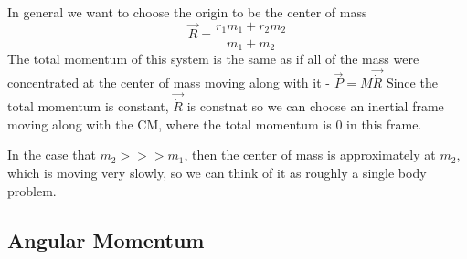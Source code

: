\documentclass{homework}
\begin{document}
In general we want to choose the origin to be the center of mass
\[\vec{R} = \frac{r_1m_1 + r_2m_2}{m_1 + m_2}\]
The total momentum of this system is the same as if all of the mass were concentrated at the center of mass moving along with it - $\vec{P} = M\vec{\dot R}$ Since the total momentum is constant, $\vec{\dot R}$ is constnat so we can choose an inertial frame moving along with the CM, where the total momentum is $0$ in this frame.

In the case that $m_2 >>> m_1$, then the center of mass is approximately at $m_2$, which is moving very slowly, so we can think of it as roughly a single body problem.

\subsection{Angular Momentum}
\end{document}
